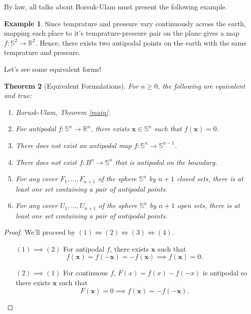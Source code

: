 \documentclass[12pt]{amsart}
\newtheorem{thm}{Theorem}[section]
\theoremstyle{definition}
\newtheorem{ex}[thm]{Example}
\begin{document}
    By law, all talks about Borsuk-Ulam must present the following example.

    \begin{ex}
        Since temprature and pressure vary continuously across the earth, mapping each place to it's temprature-pressure pair on the plane gives a map $f: \mathbb S^2 \to \mathbb R^2$. Hence, there exists two antipodal points on the earth with the same temprature and pressure.
    \end{ex}

    Let's see some equivalent forms!

    \begin{thm}[Equivalent Formulations]
        \label{equiv}
        For $n \geq 0$, the following are equivalent and true:
        \begin{enumerate}
            \item Borusk-Ulam, Theorem \ref{main}.
            \item For antipodal $f: \mathbb S^n \to \mathbb R^n$, there exists $\mathbf x \in \mathbb S^n$ such that $f(\mathbf x) = 0$.
            \item There does not exist an antipodal map $f: \mathbb S^n \to \mathbb S^{n-1}$.
            \item There does not exist $f: B^n \to \mathbb S^n$ that is antipodal on the boundary.
            \item For any cover $F_1,\ldots,F_{n+1}$ of the sphere $\mathbb S^n$ by $n+1$ closed sets, there is at least one set containing a pair of antipodal points.
            \item For any cover $U_1,\ldots,U_{n+1}$ of the sphere $\mathbb S^n$ by $n+1$ open sets, there is at least one set containing a pair of antipodal points.
        \end{enumerate}
    \end{thm}

    \begin{proof} We'll proceed by $(1) \iff (2) \iff (3) \iff (4)$.

        \begin{enumerate}
            \item[$(1) \implies (2)$] For antipodal $f$, there exists $\mathbf x$ such that $$f(\mathbf x) = f(-\mathbf x) = -f(\mathbf x) \implies f(\mathbf x) = 0.$$
            \item[$(2) \implies (1)$] For continuous $f$, $F(x) = f(x) - f(-x)$ is antipodal so there exists $\mathbf x$ such that $$F(\mathbf x) = 0 \implies f(\mathbf x) = -f(-\mathbf x).$$
        \end{enumerate}
    \end{proof}
\end{document}
